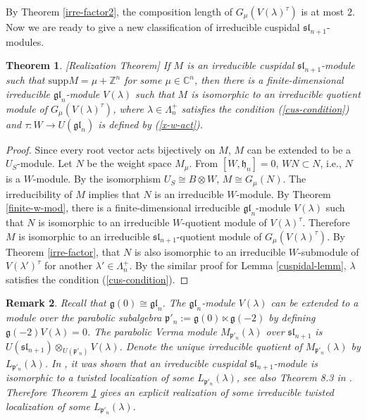 \documentclass[12pt,a4paper]{amsart}
\newtheorem{theorem}{Theorem}[section]
\newtheorem{remark}[theorem]{Remark}%
\numberwithin{equation}{section}
\newcommand{\C}{\mathbb C}
\newcommand{\Z}{\mathbb{Z}}
\def\mg{\mathfrak{g}}
\def\mh{\mathfrak{h}}
\def\sl{\mathfrak{sl}}
\def\gl{\mathfrak{gl}}
\def\l{\lambda}
\begin{document}
By Theorem \ref{irre-factor2}, the composition length  of  $G_{\mu}(V(\l)^\tau)$ is at most $2$. Now we are ready to give a new classification of irreducible
cuspidal $\sl_{n+1}$-modules.

\begin{theorem}\label{Realization-theorem}[Realization Theorem] If $M$ is an irreducible cuspidal $\sl_{n+1}$-module such that $\mathrm{supp}M=\mu+\Z^n$ for some
$\mu\in \C^n$,
then there is a finite-dimensional irreducible
$\gl_n$-module $V(\l)$ such that $M$ is isomorphic to
an irreducible quotient module of $G_\mu(V(\l)^\tau)$, where $\l\in \Lambda_n^+$ satisfies  the condition (\ref{cus-condition}) and $\tau:W\rightarrow U(\gl_n)$ is  defined by (\ref{x-w-act}).
\end{theorem}

\begin{proof}Since every root vector acts bijectively on
$M$, $M$ can be extended to be a $U_S$-module. Let $N$
be the weight space $M_\mu$. From $[W,\mh_n]=0$,
$WN\subset N$, i.e., $N$ is a $W$-module.
By the isomorphism $U_{S}\cong B \otimes W $,
$M\cong G_\mu(N)$. The irreducibility of
$M$ implies that $N$ is an irreducible $W$-module.
By Theorem \ref{finite-w-mod}, there is a finite-dimensional
irreducible $\gl_n$-module $V(\l)$ such that $N$ is isomorphic to an irreducible $W$-quotient module of $V(\l)^\tau$. Therefore $M$ is isomorphic to
an irreducible $\sl_{n+1}$-quotient module of $G_{\mu}(V(\l)^\tau)$.
By Theorem \ref{irre-factor}, that $N$ is also isomorphic to an irreducible $W$-submodule of $V(\l')^\tau$ for another $\l'\in \Lambda_n^+$. By the similar proof for Lemma \ref{cuspidal-lemm},
$\lambda$ satisfies the condition (\ref{cus-condition}).
\end{proof}

\begin{remark} Recall that  $\mg(0)\cong \gl_n$.  The $\gl_n$-module $V(\lambda)$  can be extended to a module over the parabolic subalgebra $\mathfrak{p}'_n:=\mg(0)\ltimes \mg(-2)$ by defining $\mg(-2)V(\lambda)=0$. The parabolic Verma module $M_{\mathfrak{p}'_n}(\lambda)$ over $\sl_{n+1}$ is
$U(\sl_{n+1})\otimes_{U(\mathfrak{p}'_n)}V(\lambda)$. Denote the unique irreducible   quotient of $M_{\mathfrak{p}'_n}(\lambda)$ by $L_{\mathfrak{p}'_n}(\lambda)$. In \cite{M},
it was shown that  an irreducible cuspidal $\sl_{n+1}$-module is isomorphic to a twisted localization of some $L_{\mathfrak{p}'_n}(\lambda)$, see also Theorem 8.3 in \cite{GG}. Therefore Theorem \ref{Realization-theorem} gives an explicit realization
of some irreducible  twisted localization of some $L_{\mathfrak{p}'_n}(\lambda)$.
\end{remark}
\end{document}
